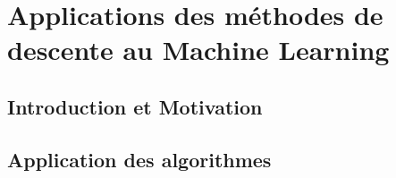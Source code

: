 \chapter{Applications des méthodes de descente au Machine Learning}
\section{Introduction et Motivation}

\section{Application des algorithmes}